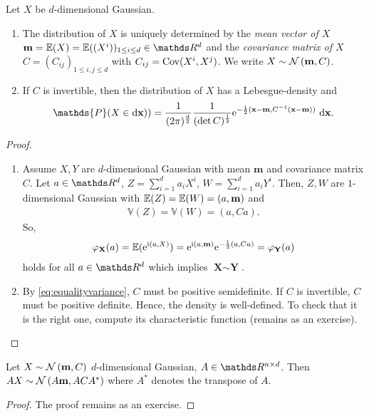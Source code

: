 \begin{thm}
Let $X$ be $d$-dimensional Gaussian.
\begin{enumerate}[label=(\alph*)]
\item The distribution of $X$ is uniquely determined by the \emph{mean vector of $X$} $\textbf{m}=\E{X}=\E{(X^i)}_{1\leq i\leq d} \in \Rd$ and the \emph{covariance matrix of $X$} $C=(C_{ij})_{1\leq i,j\leq d}$ with $C_{ij}=\operatorname{Cov}(X^i,X^j)$.
We write $X \sim \mathcal{N}\left(\textbf{m},C\right)$.
\item If $C$ is invertible, then the distribution of $X$ has a Lebesgue-density and
\begin{align*}
\mathds{P}(X \in \mathrm{d}\textbf{x}))=\frac{1}{(2 \pi)^{\frac{d}{2}}} \frac{1}{(\det C)^{\frac{1}{2}}} \e^{-\frac{1}{2}(\textbf{x}-\textbf{m},C^{-1}(\textbf{x}-\textbf{m}))}~\mathrm{d}\textbf{x}.
\end{align*}
\end{enumerate}
\end{thm}
\begin{proof}
\begin{enumerate}[label=(\alph*)]
\item Assume $X,Y$ are $d$-dimensional Gaussian with mean $\textbf{m}$ and covariance matrix $C$.
Let $a\in \Rd$, $Z=\sum_{i=1}^d a_iX^i$, $W=\sum_{i=1}^d a_i Y^i$.
Then, $Z,W$ are $1$-dimensional Gaussian with $\E{Z}=\E{W}=(a,\textbf{m})$ and
\begin{align}\label{eq:equalityvariance}
\mathds{V}(Z)=\mathds{V}(W)=(a,Ca).
\end{align}
So,
\begin{align*}
\varphi_{\textbf{X}}(a)=\E{\e^{\i (a,X)}}=\e^{\i (a,\textbf{m})}\e^{-\frac{1}{2}(a,Ca)}=\varphi_\textbf{Y}(a)
\end{align*}
holds for all $a\in\Rd$ which implies $\textbf{X}\sim \textbf{Y}$.
\item By \eqref{eq:equalityvariance}, $C$ must be positive semidefinite. If $C$ is invertible, $C$ must be positive definite.
Hence, the density is well-defined.
To check that it is the right one, compute its characteristic function (remains as an exercise). \qedhere
\end{enumerate}
\end{proof}

\begin{prop}
Let $X \sim \mathcal{N}\left(\textbf{m},C\right)$ $d$-dimensional Gaussian, $A \in \R^{n\times d}$.
Then $AX\sim \mathcal{N}\left(A\textbf{m},ACA^\ast\right)$ where $A^\ast$ denotes the transpose of $A$.
\begin{proof}
The proof remains as an exercise.
\end{proof}
\end{prop}

